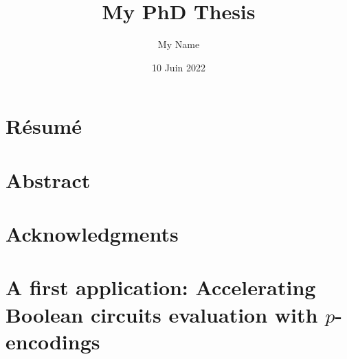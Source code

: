 \documentclass[11pt, twoside, openright]{thesis}
\title{My PhD Thesis}
\institute{l’École Normale Supérieure de Paris}
\author{My Name}
\date{10 Juin 2022}
\begin{document}
\frontmatter 
\hypersetup{pageanchor=false}
\maketitle
\hypersetup{pageanchor=true}
\dominitoc



\cleardoublepage
\chapter*{Résumé}
\thefrabstract{}
\vfill
\thefrkeywords{}
\cleardoublepage
\chapter*{Abstract}
\theenabstract{}
\vfill
\theenkeywords{}

\cleardoublepage
\chapter*{Acknowledgments}

\cleardoublepage
\hypertarget{contents}{}
\tableofcontents


\mainmatter


















\chapter{A first application: Accelerating Boolean circuits evaluation with $p$-encodings}
\end{document}
